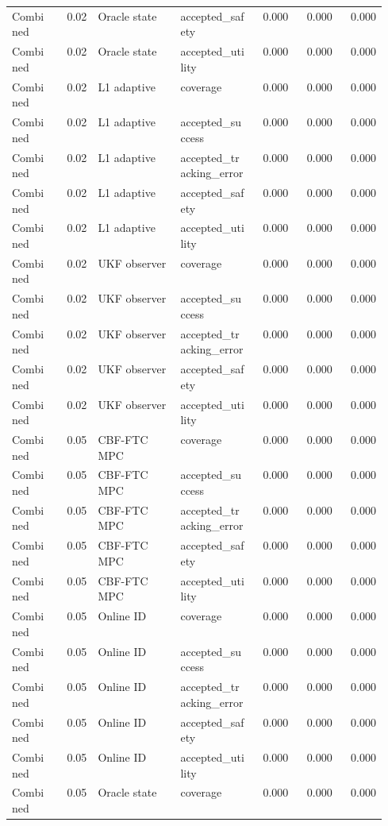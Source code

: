 \documentclass{article}
\begin{document}
\begin{center}
\begin{longtable}{p{0.13\linewidth}rp{0.22\linewidth}p{0.20\linewidth}rrr}
Combined & 0.02 & Oracle state & accepted\_safety & 0.000 & 0.000 & 0.000\\
Combined & 0.02 & Oracle state & accepted\_utility & 0.000 & 0.000 & 0.000\\
Combined & 0.02 & L1 adaptive & coverage & 0.000 & 0.000 & 0.000\\
Combined & 0.02 & L1 adaptive & accepted\_success & 0.000 & 0.000 & 0.000\\
Combined & 0.02 & L1 adaptive & accepted\_tracking\_error & 0.000 & 0.000 & 0.000\\
Combined & 0.02 & L1 adaptive & accepted\_safety & 0.000 & 0.000 & 0.000\\
Combined & 0.02 & L1 adaptive & accepted\_utility & 0.000 & 0.000 & 0.000\\
Combined & 0.02 & UKF observer & coverage & 0.000 & 0.000 & 0.000\\
Combined & 0.02 & UKF observer & accepted\_success & 0.000 & 0.000 & 0.000\\
Combined & 0.02 & UKF observer & accepted\_tracking\_error & 0.000 & 0.000 & 0.000\\
Combined & 0.02 & UKF observer & accepted\_safety & 0.000 & 0.000 & 0.000\\
Combined & 0.02 & UKF observer & accepted\_utility & 0.000 & 0.000 & 0.000\\
Combined & 0.05 & CBF-FTC MPC & coverage & 0.000 & 0.000 & 0.000\\
Combined & 0.05 & CBF-FTC MPC & accepted\_success & 0.000 & 0.000 & 0.000\\
Combined & 0.05 & CBF-FTC MPC & accepted\_tracking\_error & 0.000 & 0.000 & 0.000\\
Combined & 0.05 & CBF-FTC MPC & accepted\_safety & 0.000 & 0.000 & 0.000\\
Combined & 0.05 & CBF-FTC MPC & accepted\_utility & 0.000 & 0.000 & 0.000\\
Combined & 0.05 & Online ID & coverage & 0.000 & 0.000 & 0.000\\
Combined & 0.05 & Online ID & accepted\_success & 0.000 & 0.000 & 0.000\\
Combined & 0.05 & Online ID & accepted\_tracking\_error & 0.000 & 0.000 & 0.000\\
Combined & 0.05 & Online ID & accepted\_safety & 0.000 & 0.000 & 0.000\\
Combined & 0.05 & Online ID & accepted\_utility & 0.000 & 0.000 & 0.000\\
Combined & 0.05 & Oracle state & coverage & 0.000 & 0.000 & 0.000\\

\end{longtable}
\end{center}
\end{document}
